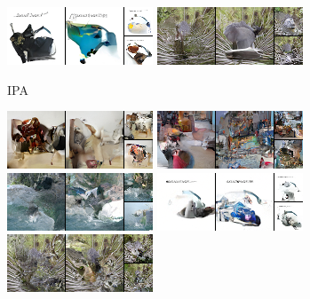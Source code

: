 \begin{figure}[t]
\begin{subfigure}[t]{0.2\textwidth}
      \includegraphics[height=\imagenetimgheight]{figs/cigcvae/image-samples/imagenet64/freeform_aipo_3_samples.png}
      \includegraphics[height=\imagenetimgheight]{figs/cigcvae/image-samples/imagenet64/freeform_aipo_4_samples.png}
      \caption{\scriptsize IPA}
    \end{subfigure}
    \begin{subfigure}[t]{0.2\textwidth}
      \centering
      \includegraphics[height=\imagenetimgheight]{figs/cigcvae/image-samples/imagenet64/freeform_aipo_0_scratch_samples.png}
      \includegraphics[height=\imagenetimgheight]{figs/cigcvae/image-samples/imagenet64/freeform_aipo_1_scratch_samples.png}
      \includegraphics[height=\imagenetimgheight]{figs/cigcvae/image-samples/imagenet64/freeform_aipo_2_scratch_samples.png}
      \includegraphics[height=\imagenetimgheight]{figs/cigcvae/image-samples/imagenet64/freeform_aipo_3_scratch_samples.png}
      \includegraphics[height=\imagenetimgheight]{figs/cigcvae/image-samples/imagenet64/freeform_aipo_4_scratch_samples.png}

\end{subfigure}
\end{figure}
